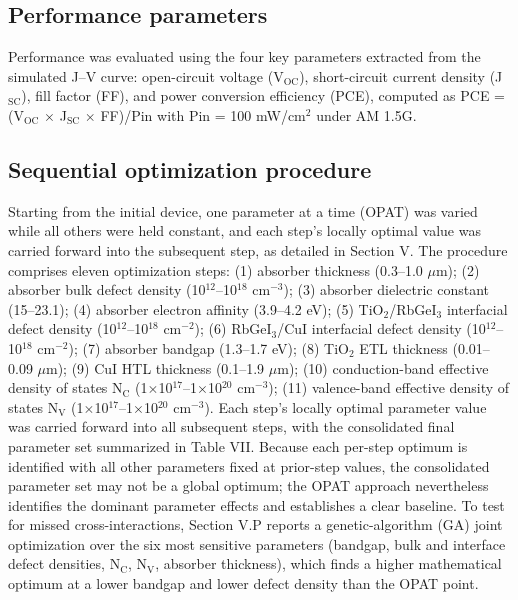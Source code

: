 \documentclass[review]{elsarticle}
\begin{document}
\subsection{Performance parameters}
Performance was evaluated using the four key parameters extracted from the simulated J--V curve: open-circuit voltage (V$_{\mathrm{OC}}$), short-circuit current density (J$_{\mathrm{SC}}$), fill factor (FF), and power conversion efficiency (PCE), computed as PCE = (V$_{\mathrm{OC}}$ $\times$ J$_{\mathrm{SC}}$ $\times$ FF)/Pin with Pin = 100 mW/cm$^{2}$ under AM 1.5G.

\subsection{Sequential optimization procedure}
Starting from the initial device, one parameter at a time (OPAT) was varied while all others were held constant, and each step's locally optimal value was carried forward into the subsequent step, as detailed in Section V.
The procedure comprises eleven optimization steps: (1) absorber thickness (0.3--1.0 $\mu$m); (2) absorber bulk defect density (10$^{12}$--10$^{18}$ cm$^{-3}$); (3) absorber dielectric constant (15--23.1); (4) absorber electron affinity (3.9--4.2 eV); (5) TiO$_{2}$/RbGeI$_{3}$ interfacial defect density (10$^{12}$--10$^{18}$ cm$^{-2}$); (6) RbGeI$_{3}$/CuI interfacial defect density (10$^{12}$--10$^{18}$ cm$^{-2}$); (7) absorber bandgap (1.3--1.7 eV); (8) TiO$_{2}$ ETL thickness (0.01--0.09 $\mu$m); (9) CuI HTL thickness (0.1--1.9 $\mu$m); (10) conduction-band effective density of states N$_{\mathrm{C}}$ (1$\times$10$^{17}$--1$\times$10$^{20}$ cm$^{-3}$); (11) valence-band effective density of states N$_{\mathrm{V}}$ (1$\times$10$^{17}$--1$\times$10$^{20}$ cm$^{-3}$). Each step's locally optimal parameter value was carried forward into all subsequent steps, with the consolidated final parameter set summarized in Table VII.
Because each per-step optimum is identified with all other parameters fixed at prior-step values, the consolidated parameter set may not be a global optimum; the OPAT approach nevertheless identifies the dominant parameter effects and establishes a clear baseline. To test for missed cross-interactions, Section V.P reports a genetic-algorithm (GA) joint optimization over the six most sensitive parameters (bandgap, bulk and interface defect densities, N$_{\mathrm{C}}$, N$_{\mathrm{V}}$, absorber thickness), which finds a higher mathematical optimum at a lower bandgap and lower defect density than the OPAT point.
\end{document}
